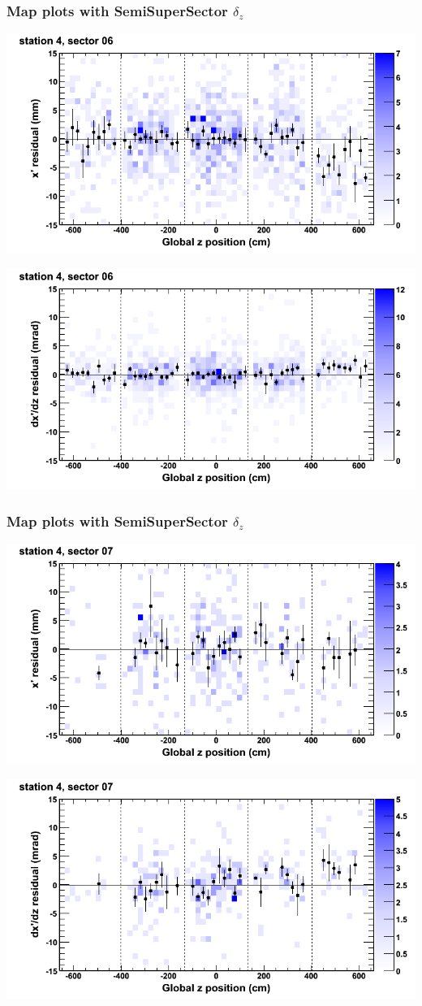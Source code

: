 \documentclass[compress]{beamer}
\begin{document}
\begin{frame}
\frametitle{Map plots with SemiSuperSector $\delta_z$}
\includegraphics[width=0.5\linewidth]{zfit_mapplots/DTvsz_st4sec06_x.png}

\includegraphics[width=0.5\linewidth]{zfit_mapplots/DTvsz_st4sec06_dxdz.png}
\end{frame}

\begin{frame}
\frametitle{Map plots with SemiSuperSector $\delta_z$}
\includegraphics[width=0.5\linewidth]{zfit_mapplots/DTvsz_st4sec07_x.png}

\includegraphics[width=0.5\linewidth]{zfit_mapplots/DTvsz_st4sec07_dxdz.png}
\end{frame}
\end{document}
